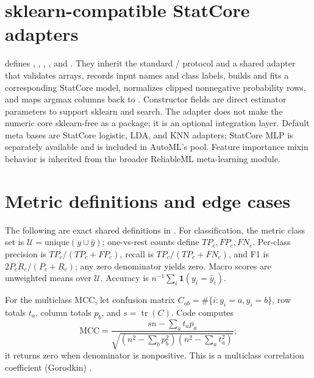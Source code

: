 ﻿\documentclass[conference]{IEEEtran}
\begin{document}
\section{sklearn-compatible StatCore adapters}
 defines , , , , and . They inherit the standard / protocol and a shared adapter that validates arrays, records input names and class labels, builds and fits a corresponding StatCore model, normalizes clipped nonnegative probability rows, and maps argmax columns back to . Constructor fields are direct estimator parameters to support sklearn  and search. The adapter does not make the numeric core sklearn-free as a package; it is an optional integration layer. Default meta bases are StatCore logistic, LDA, and KNN adapters; StatCore MLP is separately available and is included in AutoML's pool. Feature importance mixin behavior is inherited from the broader ReliableML meta-learning module.

\section{Metric definitions and edge cases}
The following are exact shared definitions in . For classification, the metric class set is \(\mathcal U=\mathrm{unique}(y\cup\hat y)\); one-vs-rest counts define \(TP_c,FP_c,FN_c\). Per-class precision is \(TP_c/(TP_c+FP_c)\), recall is \(TP_c/(TP_c+FN_c)\), and F1 is \(2P_cR_c/(P_c+R_c)\); any zero denominator yields zero. Macro scores are unweighted means over \(\mathcal U\). Accuracy is \(n^{-1}\sum_i\mathbf1(y_i=\hat y_i)\).

For the multiclass MCC, let confusion matrix \(C_{ab}=\#\{i:y_i=a,\hat y_i=b\}\), row totals \(t_a\), column totals \(p_b\), and \(s=\operatorname{tr}(C)\). Code computes
\[
\mathrm{MCC}=\frac{sn-\sum_a t_ap_a}{\sqrt{(n^2-\sum_b p_b^2)(n^2-\sum_a t_a^2)}};
\]
it returns zero when denominator is nonpositive. This is a multiclass correlation coefficient (Gorodkin) \cite{gorodkin2004}.
\end{document}
